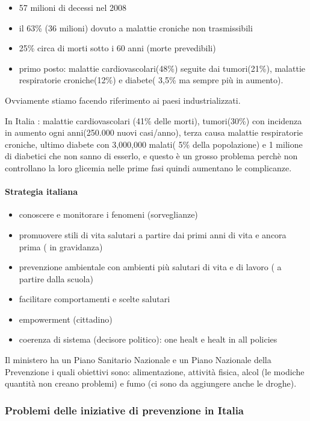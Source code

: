 \begin{itemize}
\item
  57 milioni di decessi nel 2008
\item
  il 63\% (36 milioni) dovuto a malattie croniche non trasmissibili
\item
  25\% circa di morti sotto i 60 anni (morte prevedibili)
\item
  primo posto: malattie cardiovascolari(48\%) seguite dai tumori(21\%),
  malattie respiratorie croniche(12\%) e diabete( 3,5\% ma sempre più in
  aumento).
\end{itemize}

Ovviamente stiamo facendo riferimento ai paesi industrializzati.

In Italia : malattie cardiovascolari (41\% delle morti), tumori(30\%)
con incidenza in aumento ogni anni(250.000 nuovi casi/anno), terza causa
malattie respiratorie croniche, ultimo diabete con 3,000,000 malati( 5\%
della popolazione) e 1 milione di diabetici che non sanno di esserlo, e
questo è un grosso problema perchè non controllano la loro glicemia
nelle prime fasi quindi aumentano le complicanze.

\paragraph{Strategia italiana}

\begin{itemize}
\item
  conoscere e monitorare i fenomeni (sorveglianze)
\item
  promuovere stili di vita salutari a partire dai primi anni di vita e
  ancora prima ( in gravidanza)
\item
  prevenzione ambientale con ambienti più salutari di vita e di lavoro (
  a partire dalla scuola)
\item
  facilitare comportamenti e scelte salutari
\item
  empowerment (cittadino)
\item
  coerenza di sistema (decisore politico): one healt e healt in all
  policies
\end{itemize}

Il ministero ha un Piano Sanitario Nazionale e un Piano Nazionale della
Prevenzione i quali obiettivi sono: alimentazione, attività fisica,
alcol (le modiche quantità non creano problemi) e fumo (ci sono da
aggiungere anche le droghe).

\subsubsection{Problemi delle iniziative di prevenzione in Italia}


